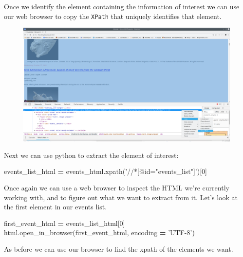 \documentclass[]{book}
\newenvironment{Shaded}{\begin{snugshade}}{\end{snugshade}}
\newcommand{\DecValTok}[1]{\textcolor[rgb]{0.00,0.00,0.81}{#1}}
\newcommand{\StringTok}[1]{\textcolor[rgb]{0.31,0.60,0.02}{#1}}
\newcommand{\OperatorTok}[1]{\textcolor[rgb]{0.81,0.36,0.00}{\textbf{#1}}}
\newcommand{\NormalTok}[1]{#1}
\begin{document}
Once we identify the element containing the information of interest we
can use our web browser to copy the \texttt{XPath} that uniquely
identifies that element.

\begin{figure}
\centering
\includegraphics{Python/PythonWebScrape/images/dev_tools_xpath.png}
\caption{}
\end{figure}

Next we can use python to extract the element of interest:

\begin{Shaded}
\begin{Highlighting}[]
\NormalTok{events_list_html }\OperatorTok{=}\NormalTok{ events_html.xpath(}\StringTok{'//*[@id="events_list"]'}\NormalTok{)[}\DecValTok{0}\NormalTok{]}
\end{Highlighting}
\end{Shaded}

Once again we can use a web browser to inspect the HTML we're currently
working with, and to figure out what we want to extract from it. Let's
look at the first element in our events list.

\begin{Shaded}
\begin{Highlighting}[]
\NormalTok{first_event_html }\OperatorTok{=}\NormalTok{ events_list_html[}\DecValTok{0}\NormalTok{]}
\NormalTok{html.open_in_browser(first_event_html, encoding }\OperatorTok{=} \StringTok{'UTF-8'}\NormalTok{)}
\end{Highlighting}
\end{Shaded}

As before we can use our browser to find the xpath of the elements we
want.
\end{document}
